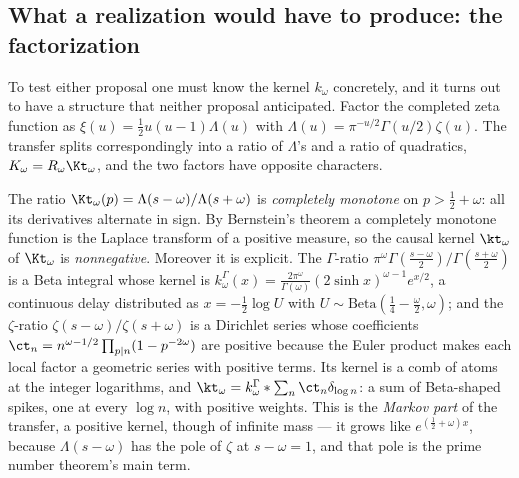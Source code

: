 \subsection{What a realization would have to produce: the factorization}

To test either proposal one must know the kernel $k_\omega$ concretely, and it
turns out to have a structure that neither proposal anticipated. Factor the
completed zeta function as $\xi(u)=\frac12u(u-1)\Lambda(u)$ with
$\Lambda(u)=\pi^{-u/2}\Gamma(u/2)\zeta(u)$. The transfer splits
correspondingly into a ratio of $\Lambda$'s and a ratio of quadratics,
$K_\omega=R_\omega\Kt_\omega$, and the two factors have opposite characters.

The ratio $\Kt_\omega(p)=\Lambda(s-\omega)/\Lambda(s+\omega)$ is
\emph{completely monotone} on $p>\frac12+\omega$: all its derivatives alternate
in sign. By Bernstein's theorem a completely monotone function is the Laplace
transform of a positive measure, so the causal kernel $\kt_\omega$ of
$\Kt_\omega$ is \emph{nonnegative}. Moreover it is explicit. The $\Gamma$-ratio
$\pi^\omega\Gamma(\frac{s-\omega}2)/\Gamma(\frac{s+\omega}2)$ is a Beta integral
whose kernel is
$k^\Gamma_\omega(x)=\frac{2\pi^\omega}{\Gamma(\omega)}(2\sinh x)^{\omega-1}e^{x/2}$,
a continuous delay distributed as $x=-\frac12\log U$ with
$U\sim\mathrm{Beta}(\frac14-\frac\omega2,\omega)$; and the $\zeta$-ratio
$\zeta(s-\omega)/\zeta(s+\omega)$ is a Dirichlet series whose coefficients
$\ct_n=n^{\omega-1/2}\prod_{p\mid n}(1-p^{-2\omega})$ are positive because the
Euler product makes each local factor a geometric series with positive terms.
Its kernel is a comb of atoms at the integer logarithms, and
$\kt_\omega=k^\Gamma_\omega*\sum_n\ct_n\delta_{\log n}$: a sum of Beta-shaped
spikes, one at every $\log n$, with positive weights. This is the
\emph{Markov part} of the transfer, a positive kernel, though of infinite
mass --- it grows like $e^{(\frac12+\omega)x}$, because $\Lambda(s-\omega)$ has
the pole of $\zeta$ at $s-\omega=1$, and that pole is the prime number theorem's
main term.


